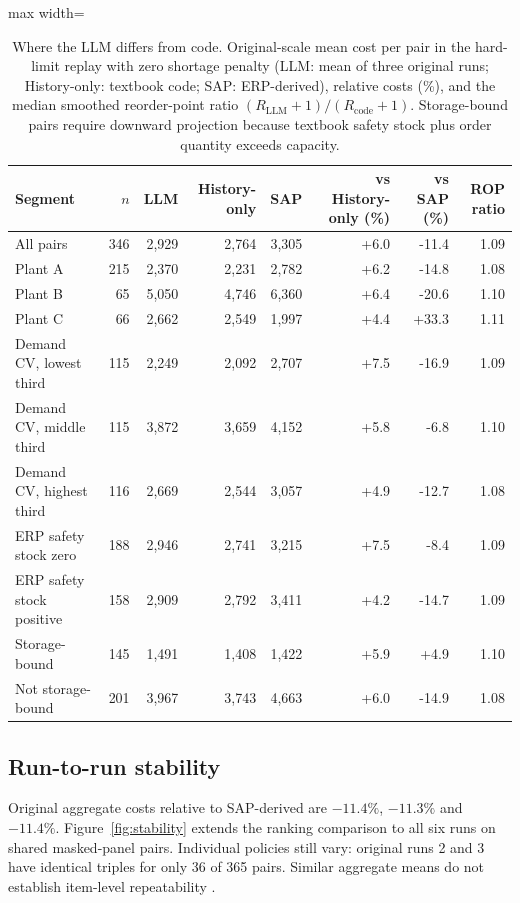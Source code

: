 \documentclass[preprint,12pt,nonatbib]{elsarticle}
\let\cite\parencite
\begin{document}
\begin{table}[htbp]
\centering
\caption{Where the LLM differs from code. Original-scale mean cost per pair in the hard-limit replay with zero shortage penalty (LLM: mean of three original runs; History-only: textbook code; SAP: ERP-derived), relative costs (\%), and the median smoothed reorder-point ratio $(R_{\mathrm{LLM}}+1)/(R_{\mathrm{code}}+1)$. Storage-bound pairs require downward projection because textbook safety stock plus order quantity exceeds capacity.}
\label{tab:mechanism}
\scriptsize\setlength{\tabcolsep}{3pt}
\begin{adjustbox}{max width=\textwidth}
\begin{tabular}{l r r r r r r r}
\hline
Segment & $n$ & LLM & History-only & SAP & vs History-only (\%) & vs SAP (\%) & ROP ratio \\
\hline
All pairs & 346 & 2{,}929 & 2{,}764 & 3{,}305 & +6.0 & -11.4 & 1.09 \\
Plant A & 215 & 2{,}370 & 2{,}231 & 2{,}782 & +6.2 & -14.8 & 1.08 \\
Plant B & 65 & 5{,}050 & 4{,}746 & 6{,}360 & +6.4 & -20.6 & 1.10 \\
Plant C & 66 & 2{,}662 & 2{,}549 & 1{,}997 & +4.4 & +33.3 & 1.11 \\
Demand CV, lowest third & 115 & 2{,}249 & 2{,}092 & 2{,}707 & +7.5 & -16.9 & 1.09 \\
Demand CV, middle third & 115 & 3{,}872 & 3{,}659 & 4{,}152 & +5.8 & -6.8 & 1.10 \\
Demand CV, highest third & 116 & 2{,}669 & 2{,}544 & 3{,}057 & +4.9 & -12.7 & 1.08 \\
ERP safety stock zero & 188 & 2{,}946 & 2{,}741 & 3{,}215 & +7.5 & -8.4 & 1.09 \\
ERP safety stock positive & 158 & 2{,}909 & 2{,}792 & 3{,}411 & +4.2 & -14.7 & 1.09 \\
Storage-bound & 145 & 1{,}491 & 1{,}408 & 1{,}422 & +5.9 & +4.9 & 1.10 \\
Not storage-bound & 201 & 3{,}967 & 3{,}743 & 4{,}663 & +6.0 & -14.9 & 1.08 \\
\hline
\end{tabular}
\end{adjustbox}
\end{table}

\subsection{Run-to-run stability}
\label{subsec:stability}
Original aggregate costs relative to SAP-derived are $-11.4\%$, $-11.3\%$ and $-11.4\%$. Figure~\ref{fig:stability} extends the ranking comparison to all six runs on shared masked-panel pairs. Individual policies still vary: original runs 2 and 3 have identical triples for only 36 of 365 pairs. Similar aggregate means do not establish item-level repeatability \cite{ouyang2025nondeterminism}.
\end{document}
